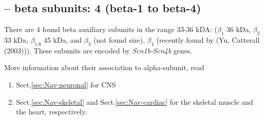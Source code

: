   
\subsection{-- beta subunits: 4 (beta-1 to beta-4)}
\label{sec:Na-channel-beta-subunit}

There are 4 found beta auxiliary subunits in the range 33-36 kDA:
  ($\beta_1$ 36 kDa, $\beta_2$
33 kDa, $\beta_{1A}$ 45 kDa, and $\beta_3$ (not found size), $\beta_4$ (recently
found by (Yu, Catterall (2003))). These subunits are encoded by {\it
Scn1b-Scn4b} genes.

More information about their association to alpha-subunit, read 
\begin{enumerate}
  \item Sect.\ref{sec:Nav-neuronal} for CNS
  
  \item Sect.\ref{sec:Nav-skeletal} and Sect.\ref{sec:Nav-cardiac} for the
  skeletal muscle and the heart, respectively.
  
\end{enumerate}



